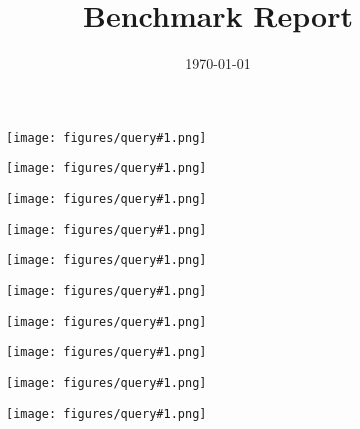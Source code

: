 \documentclass[a4paper,12pt]{report}
\title{Benchmark Report}
\date{\today}
\newcommand{\showq}[1]{
    \begin{figure}
	\centering
	\texttt{[image: figures/query\#1.png]}
	\label{bench:query#1}
    \end{figure}
}
\begin{document}

\maketitle

\showq{0}

\showq{1}

\showq{2}

\showq{3}

\showq{4}

\showq{5}

\showq{6}

\showq{7}

\showq{8}

\showq{9}
\end{document}
